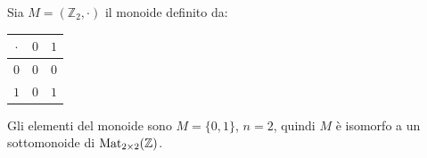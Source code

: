 \documentclass[../main.tex]{subfiles}
\begin{document}
\begin{example}
    Sia $M = (\mathbb{Z}_2, \cdot)$ il monoide definito da:
    \vspace*{0.5em}
    \begin{center}
        \begin{tabular}{c|c|c}
            $\cdot$ & $0$ & $1$ \\
            \hline
            $0$     & $0$ & $0$ \\
            \hline
            $1$     & $0$ & $1$ \\
        \end{tabular}
    \end{center}
    \vspace*{0.5em}
    Gli elementi del monoide sono $M = \{0,1\}$, $n = 2$, quindi $M$ è isomorfo a un sottomonoide di $\operatorname{Mat}_{2 \times 2}(\mathbb{Z})$.


\end{example}
\end{document}
